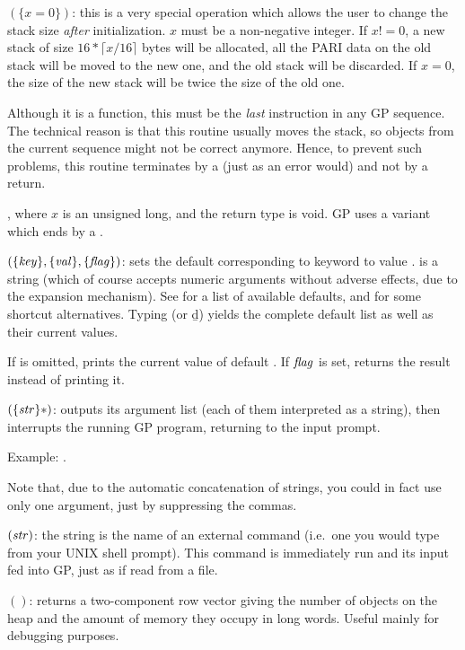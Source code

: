 $(\{x=0\})$: this is a very special operation which
allows the user to change the stack size \emph{after} initialization. $x$
must be a non-negative integer. If $x!=0$, a new stack of size $16*\lceil
x/16\rceil$ bytes will be allocated, all the PARI data on the old stack will
be moved to the new one, and the old stack will be discarded. If $x=0$, the
size of the new stack will be twice the size of the old one.

Although it is a function, this must be the \emph{last} instruction in any GP
sequence. The technical reason is that this routine usually moves the stack,
so objects from the current sequence might not be correct anymore. Hence, to
prevent such problems, this routine terminates by a  (just as an
error would) and not by a return.

, where $x$ is an unsigned long, and the return type
is void. GP uses a variant which ends by a .

$(\{\hbox{\it key\/}\},\{\hbox{\it val\/}\},\{\hbox{\it f\kern0pt lag\/}\})$: sets the default
corresponding to keyword  to value .  is a string
(which of course accepts numeric arguments without adverse effects, due to the
expansion mechanism). See  for a list of available
defaults, and  for some shortcut alternatives. Typing
 (or \b{d}) yields the complete default list as well as
their current values.\label{se:default}

If  is omitted, prints the current value of default .
If $\hbox{\it f\kern0pt lag\/}$ is set, returns the result instead of printing it.

$(\{\hbox{\it str\/}\}*)$: outputs its argument list (each of
them interpreted as a string), then interrupts the running GP program,
returning to the input prompt.

Example: .

Note that, due to the automatic concatenation of strings, you could in fact
use only one argument, just by suppressing the commas.

$(\hbox{\it str\/})$: the string  is the name
of an external command (i.e.~one you would type from your UNIX shell prompt).
This command is immediately run and its input fed into GP, just as if read
from a file.

$()$: returns a two-component row vector giving the
number of objects on the heap and the amount of memory they occupy in long
words. Useful mainly for debugging purposes.

